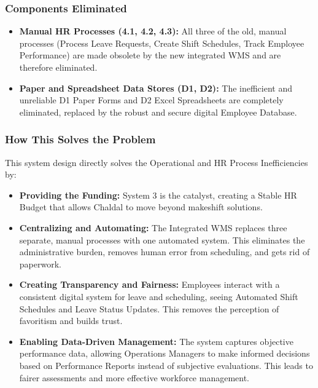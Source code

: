 \documentclass[12pt,a4paper]{article}
\begin{document}
\subsubsection{Components Eliminated}
\begin{tcolorbox}[colback=red!5!white,colframe=red!75!black,title=Eliminated]
\begin{itemize}
    \item \textbf{Manual HR Processes (4.1, 4.2, 4.3):} All three of the old, manual processes (Process Leave Requests, Create Shift Schedules, Track Employee Performance) are made obsolete by the new integrated WMS and are therefore eliminated.
    \item \textbf{Paper and Spreadsheet Data Stores (D1, D2):} The inefficient and unreliable D1 Paper Forms and D2 Excel Spreadsheets are completely eliminated, replaced by the robust and secure digital Employee Database.
\end{itemize}
\end{tcolorbox}

\subsubsection{How This Solves the Problem}
This system design directly solves the Operational and HR Process Inefficiencies by:
\begin{itemize}[leftmargin=*]
  \item \textbf{Providing the Funding:} System 3 is the catalyst, creating a Stable HR Budget that allows Chaldal to move beyond makeshift solutions.
  \item \textbf{Centralizing and Automating:} The Integrated WMS replaces three separate, manual processes with one automated system. This eliminates the administrative burden, removes human error from scheduling, and gets rid of paperwork.
  \item \textbf{Creating Transparency and Fairness:} Employees interact with a consistent digital system for leave and scheduling, seeing Automated Shift Schedules and Leave Status Updates. This removes the perception of favoritism and builds trust.
  \item \textbf{Enabling Data-Driven Management:} The system captures objective performance data, allowing Operations Managers to make informed decisions based on Performance Reports instead of subjective evaluations. This leads to fairer assessments and more effective workforce management.
\end{itemize}
\end{document}
